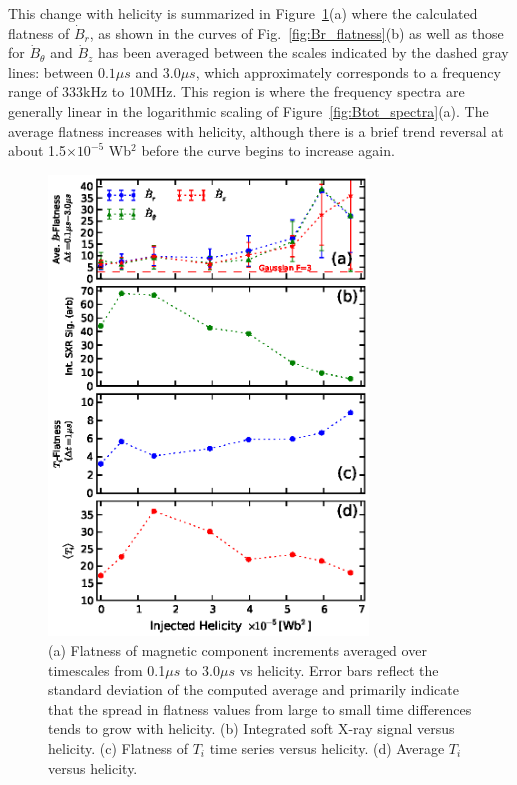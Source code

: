 \documentclass[aps,prl,amsmath,amssymb,reprint,superscriptaddress]{revtex4-1} %
\begin{document}
This change with helicity is summarized in Figure~\ref{fig:flatness_scaling}(a) where the calculated flatness of $\dot{B}_{r}$, as shown in the curves of Fig.~\ref{fig:Br_flatness}(b) as well as those for $\dot{B}_{\theta}$ and $\dot{B}_{z}$ has been averaged between the scales indicated by the dashed gray lines: between $0.1\mu s$ and $3.0\mu s$, which approximately corresponds to a frequency range of 333kHz to 10MHz. This region is where the frequency spectra are generally linear in the logarithmic scaling of Figure~\ref{fig:Btot_spectra}(a). The average flatness increases with helicity, although there is a brief trend reversal at about 1.5$\times 10^{-5}$ Wb$^{2}$ before the curve begins to increase again.

\begin{figure}[!htbp]
\centerline{
\includegraphics[width=8.5cm]{figure4.eps}}
\caption{\label{fig:flatness_scaling} (a) Flatness of magnetic component increments averaged over timescales from 0.1$\mu s$ to 3.0$\mu s$ vs helicity. Error bars reflect the standard deviation of the computed average and primarily indicate that the spread in flatness values from large to small time differences tends to grow with helicity. (b) Integrated soft X-ray signal versus helicity. (c) Flatness of $T_{i}$ time series versus helicity. (d) Average $T_{i}$ versus helicity.}
\end{figure}
\end{document}
